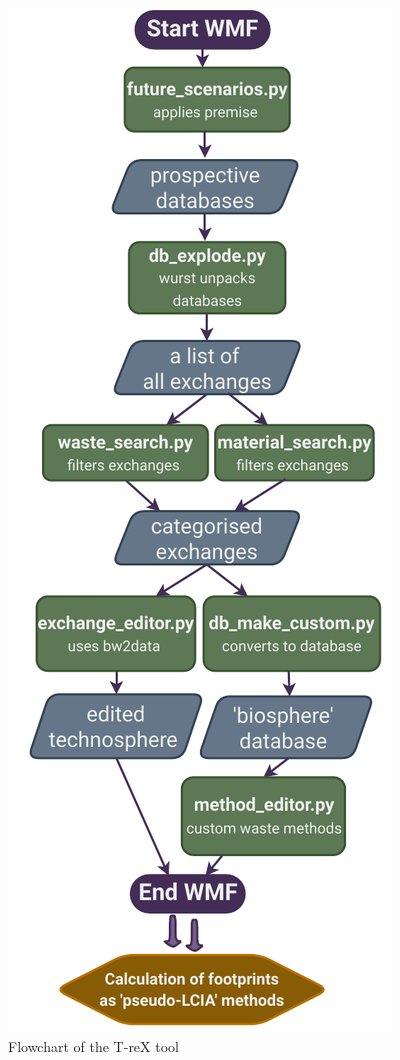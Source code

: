\begin{figure}[h!]
    \centering
    \includegraphics[height=0.8\textheight]{figures/WMF_flowchart.pdf}
    \caption{Flowchart of the T-reX tool}\label{fig:WMF_flowchart}
\end{figure}

